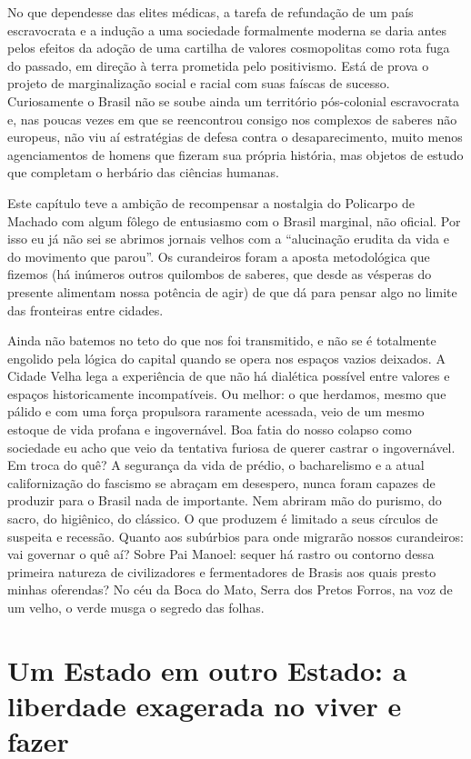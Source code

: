 No que dependesse das elites médicas, a tarefa de refundação de um país
escravocrata e a indução a uma sociedade formalmente moderna se daria
antes pelos efeitos da adoção de uma cartilha de valores cosmopolitas
como rota fuga do passado, em direção à terra prometida pelo
positivismo. Está de prova o projeto de marginalização social e racial
com suas faíscas de sucesso. Curiosamente o Brasil não se soube ainda um
território pós-colonial escravocrata e, nas poucas vezes em que se
reencontrou consigo nos complexos de saberes não europeus, não viu aí
estratégias de defesa contra o desaparecimento, muito menos
agenciamentos de homens que fizeram sua própria história, mas objetos de
estudo que completam o herbário das ciências humanas.

Este capítulo teve a ambição de recompensar a nostalgia do Policarpo de
Machado com algum fôlego de entusiasmo com o Brasil marginal, não
oficial. Por isso eu já não sei se abrimos jornais velhos com a
``alucinação erudita da vida e do movimento que parou''. Os curandeiros
foram a aposta metodológica que fizemos (há inúmeros outros quilombos de
saberes, que desde as vésperas do presente alimentam nossa potência de
agir) de que dá para pensar algo no limite das fronteiras entre cidades.

Ainda não batemos no teto do que nos foi transmitido, e não se é
totalmente engolido pela lógica do capital quando se opera nos espaços
vazios deixados. A Cidade Velha lega a experiência de que não há
dialética possível entre valores e espaços historicamente incompatíveis.
Ou melhor: o que herdamos, mesmo que pálido e com uma força propulsora
raramente acessada, veio de um mesmo estoque de vida profana e
ingovernável. Boa fatia do nosso colapso como sociedade eu acho que veio
da tentativa furiosa de querer castrar o ingovernável. Em troca do quê?
A segurança da vida de prédio, o bacharelismo e a atual californização
do fascismo se abraçam em desespero, nunca foram capazes de produzir
para o Brasil nada de importante. Nem abriram mão do purismo, do sacro,
do higiênico, do clássico. O que produzem é limitado a seus círculos de
suspeita e recessão. Quanto aos subúrbios para onde migrarão nossos
curandeiros: vai governar o quê aí? Sobre Pai Manoel: sequer há rastro
ou contorno dessa primeira natureza de civilizadores e fermentadores de
Brasis aos quais presto minhas oferendas? No céu da Boca do Mato, Serra
dos Pretos Forros, na voz de um velho, o verde musga o segredo das
folhas.

\hypertarget{um-estado-em-outro-estado-a-liberdade-exagerada-no-viver-e-fazer}{%
\section{Um Estado em outro Estado: a liberdade exagerada no viver e
fazer}\label{um-estado-em-outro-estado-a-liberdade-exagerada-no-viver-e-fazer}}

